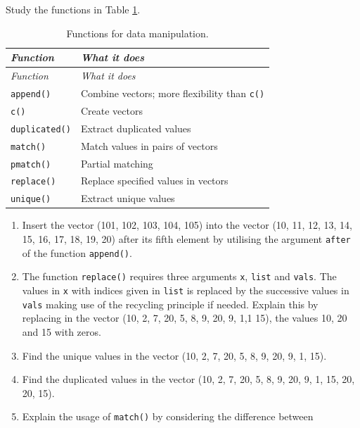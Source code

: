 \documentclass[
]{book}
\begin{document}
Study the functions in Table \ref{tab:DataManipulation}.

\begin{longtable}[]{@{}
  >{\raggedright\arraybackslash}p{}
  >{\raggedright\arraybackslash}p{}@{}}
\caption{\label{tab:DataManipulation} Functions for data manipulation.}\tabularnewline
\toprule\noalign{}
\begin{minipage}[b]{\linewidth}\raggedright
\emph{{Function}}
\end{minipage} & \begin{minipage}[b]{\linewidth}\raggedright
\emph{{What it does}}
\end{minipage} \\
\midrule\noalign{}
\endfirsthead
\toprule\noalign{}
\begin{minipage}[b]{\linewidth}\raggedright
\emph{{Function}}
\end{minipage} & \begin{minipage}[b]{\linewidth}\raggedright
\emph{{What it does}}
\end{minipage} \\
\midrule\noalign{}
\endhead
\bottomrule\noalign{}
\endlastfoot
\texttt{append()} & Combine vectors; more flexibility than \texttt{c()} \\
\texttt{c()} & Create vectors \\
\texttt{duplicated()} & Extract duplicated values \\
\texttt{match()} & Match values in pairs of vectors \\
\texttt{pmatch()} & Partial matching \\
\texttt{replace()} & Replace specified values in vectors \\
\texttt{unique()} & Extract unique values \\
\end{longtable}

\begin{enumerate}
\def\labelenumi{(\alph{enumi})}
\item
  Insert the vector (101, 102, 103, 104, 105) into the vector (10, 11, 12, 13, 14, 15, 16, 17, 18, 19, 20) after its fifth element by utilising the argument \texttt{after} of the function \texttt{append()}.
\item
  The function \texttt{replace()} requires three arguments \texttt{x}, \texttt{list} and \texttt{vals}. The values in \texttt{x} with indices given in \texttt{list} is replaced by the successive values in \texttt{vals} making use of the recycling principle if needed. Explain this by replacing in the vector (10, 2, 7, 20, 5, 8, 9, 20, 9, 1,1 15), the values 10, 20 and 15 with zeros.
\item
  Find the unique values in the vector (10, 2, 7, 20, 5, 8, 9, 20, 9, 1, 15).
\item
  Find the duplicated values in the vector (10, 2, 7, 20, 5, 8, 9, 20, 9, 1, 15, 20, 20, 15).
\item
  Explain the usage of \texttt{match()} by considering the difference between
\end{enumerate}
\end{document}
